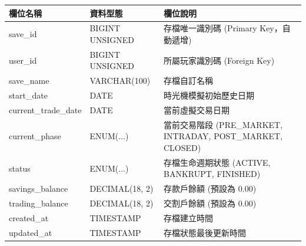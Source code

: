 \documentclass[UTF8, a4paper, 12pt, fontset=none]{ctexart}
\begin{document}
    \begin{center}
    \begin{tabular}{|l|l|p{8cm}|}
    \hline
    \textbf{欄位名稱} & \textbf{資料型態} & \textbf{欄位說明} \\ \hline
    save\_id & BIGINT UNSIGNED & 存檔唯一識別碼 (Primary Key，自動遞增) \\ \hline
    user\_id & BIGINT UNSIGNED & 所屬玩家識別碼 (Foreign Key) \\ \hline
    save\_name & VARCHAR(100) & 存檔自訂名稱 \\ \hline
    start\_date & DATE & 時光機模擬初始歷史日期 \\ \hline
    current\_trade\_date & DATE & 當前虛擬交易日期 \\ \hline
    current\_phase & ENUM(...) & 當前交易階段 (PRE\_MARKET, INTRADAY, POST\_MARKET, CLOSED) \\ \hline
    status & ENUM(...) & 存檔生命週期狀態 (ACTIVE, BANKRUPT, FINISHED) \\ \hline
    savings\_balance & DECIMAL(18, 2) & 存款戶餘額 (預設為 0.00) \\ \hline
    trading\_balance & DECIMAL(18, 2) & 交割戶餘額 (預設為 0.00) \\ \hline
    created\_at & TIMESTAMP & 存檔建立時間 \\ \hline
    updated\_at & TIMESTAMP & 存檔狀態最後更新時間 \\ \hline
    \end{tabular}
    \end{center}
\end{document}
